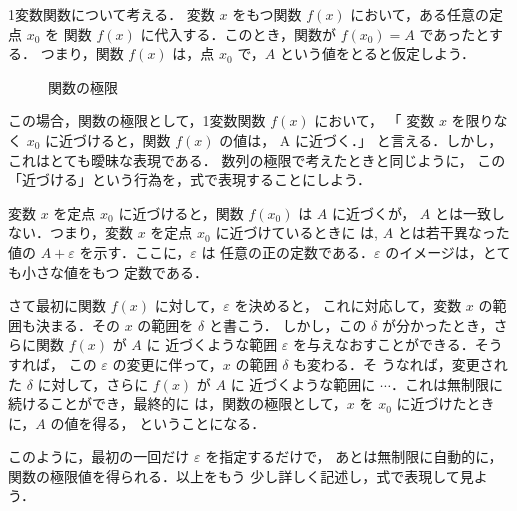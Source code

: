                 1変数関数について考える．
                変数 $x$ をもつ関数 $f(x)$ において，ある任意の定点 $x_{0}$ を
                関数 $f(x)$ に代入する．このとき，関数が $f(x_{0})=A$ であったとする．
                つまり，関数 $f(x)$ は，点 $x_{0}$ で，$A$ という値をとると仮定しよう．

                    \begin{figure}[hbt]
                        \begin{center}
                            \caption{関数の極限}
                            \label{fig:EpDl}
                        \end{center}
                    \end{figure}

                この場合，関数の極限として，1変数関数 $f(x)$ において，
                   「 変数 $x$ を限りなく $x_{0}$ に近づけると，関数 $f(x)$ の値は，
                    A に近づく．」
                と言える．しかし，これはとても曖昧な表現である．
                数列の極限で考えたときと同じように，
                この「近づける」という行為を，式で表現することにしよう．

                変数 $x$ を定点 $x_{0}$ に近づけると，関数 $f(x_{0})$ は $A$ に近づくが，
                $A$ とは一致しない．つまり，変数 $x$ を定点 $x_{0}$ に近づけているときに
                は, $A$ とは若干異なった値の $A+\varepsilon $ を示す．ここに，$\varepsilon$ は
                任意の正の定数である．$\varepsilon $ のイメージは，とても小さな値をもつ
                定数である．

                さて最初に関数 $f(x)$ に対して，$\varepsilon $ を決めると，
                これに対応して，変数 $x$ の範囲も決まる．その $x$ の範囲を $\delta $ と書こう．
                しかし，この $\delta $ が分かったとき，さらに関数 $f(x)$ が $A$ に
                近づくような範囲 $\varepsilon $ を与えなおすことができる．そうすれば，
                この $\varepsilon $ の変更に伴って，$x$ の範囲 $\delta $ も変わる．そ
                うなれば，変更された $\delta $ に対して，さらに $f(x)$  が $A$ に
                近づくような範囲に $\cdots$．これは無制限に続けることができ，最終的に
                は，関数の極限として，$x$ を $x_{0}$ に近づけたときに，$A$ の値を得る，
                ということになる．

                このように，最初の一回だけ $\varepsilon$ を指定するだけで，
                あとは無制限に自動的に，関数の極限値を得られる．以上をもう
                少し詳しく記述し，式で表現して見よう．

